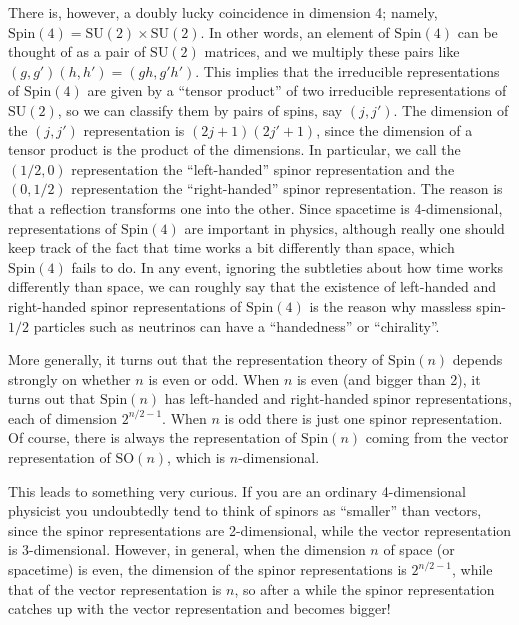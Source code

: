\documentclass{article}
\begin{document}
There is, however, a doubly lucky coincidence in dimension 4; namely,
\(\mathrm{Spin}(4) = \mathrm{SU}(2) \times \mathrm{SU}(2)\). In other
words, an element of \(\mathrm{Spin}(4)\) can be thought of as a pair of
\(\mathrm{SU}(2)\) matrices, and we multiply these pairs like
\((g,g')(h,h') = (gh,g'h')\). This implies that the irreducible
representations of \(\mathrm{Spin}(4)\) are given by a ``tensor
product'' of two irreducible representations of \(\mathrm{SU}(2)\), so
we can classify them by pairs of spins, say \((j,j')\). The dimension of
the \((j,j')\) representation is \((2j+1)(2j'+1)\), since the dimension
of a tensor product is the product of the dimensions. In particular, we
call the \((1/2,0)\) representation the ``left-handed'' spinor
representation and the \((0,1/2)\) representation the ``right-handed''
spinor representation. The reason is that a reflection transforms one
into the other. Since spacetime is 4-dimensional, representations of
\(\mathrm{Spin}(4)\) are important in physics, although really one
should keep track of the fact that time works a bit differently than
space, which \(\mathrm{Spin}(4)\) fails to do. In any event, ignoring
the subtleties about how time works differently than space, we can
roughly say that the existence of left-handed and right-handed spinor
representations of \(\mathrm{Spin}(4)\) is the reason why massless
spin-\(1/2\) particles such as neutrinos can have a ``handedness'' or
``chirality''.

More generally, it turns out that the representation theory of
\(\mathrm{Spin}(n)\) depends strongly on whether \(n\) is even or odd.
When \(n\) is even (and bigger than 2), it turns out that
\(\mathrm{Spin}(n)\) has left-handed and right-handed spinor
representations, each of dimension \(2^{n/2-1}\). When \(n\) is odd
there is just one spinor representation. Of course, there is always the
representation of \(\mathrm{Spin}(n)\) coming from the vector
representation of \(\mathrm{SO}(n)\), which is \(n\)-dimensional.

This leads to something very curious. If you are an ordinary
4-dimensional physicist you undoubtedly tend to think of spinors as
``smaller'' than vectors, since the spinor representations are
2-dimensional, while the vector representation is 3-dimensional.
However, in general, when the dimension \(n\) of space (or spacetime) is
even, the dimension of the spinor representations is \(2^{n/2-1}\),
while that of the vector representation is \(n\), so after a while the
spinor representation catches up with the vector representation and
becomes bigger!
\end{document}
